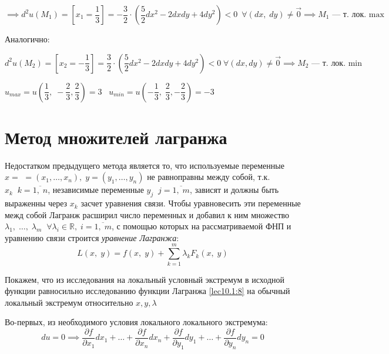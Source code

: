 \documentclass[../../main.tex]{subfiles}
\begin{document}
	\[\implies d^2u\left(M_1\right) = \left[x_1 = \dfrac{1}{3}\right] = 
	-\dfrac{3}{2}\cdot(\dfrac{5}{2}dx^2 - 2dxdy + 4dy^2) < 0\ \; 
	\forall \left(dx, \; dy\right) \neq \vec{0} \implies M_1 \text{~--- т. лок. max}\]
	
	Аналогично:
	
	\[d^2u \left(M_2\right) = \left[x_2 = -\dfrac{1}{3} \right] = 
	\dfrac{3}{2} \cdot \left( \dfrac{5}{2} dx^2 - 2dxdy + 4dy^2\right) < 0 
	\; \forall \left(dx, dy\right) \neq \vec{0} \implies M_2 
	\text{~--- т. лок. min}\]
	
	$u_{max} = u\left(\dfrac{1}{3}, \; -\dfrac{2}{3}, 
	\dfrac{2}{3}\right) = 3 \;\;\; 
	u_{min} = u\left(-\dfrac{1}{3}, \; 
	\dfrac{2}{3}, -\dfrac{2}{3}\right) = -3$ 
	
	\section{Метод множителей лагранжа} 
	
	Недостатком предыдущего метода является то, что используемые переменные 
	$x = $ $=\left(x_1, \ldots, x_n\right), \; y = \left(y_1,\ldots, y_n\right)$
	не равноправны между собой, т.к. $x_k \;\; k = \overline{1,\; n}$, 
	независимые переменные $y_j \;\; j = \overline{1,\; m}$, зависят и 
	должны быть выраженны через $x_k$ засчет уравнения связи. 
	Чтобы уравновесить эти переменные межд собой Лагранж расширил 
	число переменных и добавил к ним множество 
	$\lambda_1,\; \ldots,\; \lambda_m \;\; \forall 
	\lambda_i \in \mathbb{R}, \; i = \overline{1,\; m}$, 
	с помощью которых на рассматриваемой ФНП и уравнению 
	связи строится \emph{уравнение Лагранжа}:
	\begin{equation}
	L\left(x, \; y\right) = f\left(x, \; y\right) + \sum\limits_{k = 1}^m 
	\lambda_k F_k\left(x, \; y\right) \label{lec10.1:8}
	\end{equation}
	
	
	Покажем, что из исследования на локальный условный экстремум в исходной 
	функции равносильно исследованию функции Лагранжа 
	\eqref{lec10.1:8} на обычный локальный экстремум относительно $x, y,\lambda$
	
	Во-первых, из необходимого условия локального локального экстремума:
	\begin{equation}
	du = 0 \implies \dfrac{\partial f}{\partial x_1} dx_1 + \ldots + 
	\dfrac{\partial f}{\partial x_n} dx_n + \dfrac{\partial f}{\partial y_1}dy_1
	 + \ldots + \dfrac{\partial f}{\partial y_n} dy_n = 0 \label{lec10.1:9}
	\end{equation}
	
\end{document}
